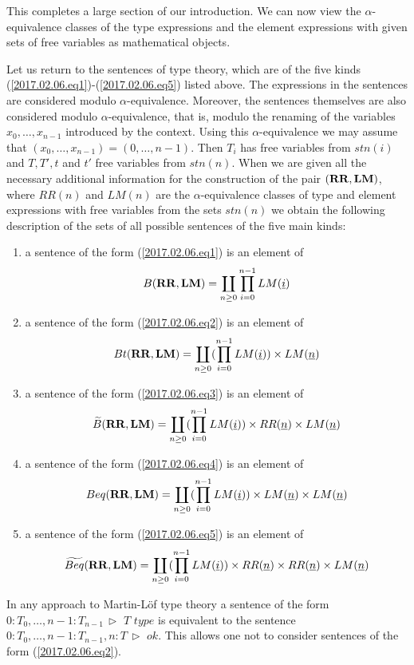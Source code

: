 \documentclass[12pt]{amsart}
\newcommand{\uu}{\underline}
\newcommand{\wt}{\widetilde}
\newcommand{\RR}{{\bf RR}}
\newcommand{\LM}{{\bf LM}}
\newcommand{\rh}{{\,\rhd\,\,}}
\newcommand{\type}{\,\,type}
\newcommand{\ff}[1]{\uu{#1}}
\begin{document}
This completes a large section of our introduction. We can now view the
$\alpha$-equivalence classes of the type expressions and the element expressions with given
sets of free variables as mathematical objects.

Let us return to the sentences of type theory, which are of the five kinds
(\ref{2017.02.06.eq1})-(\ref{2017.02.06.eq5}) listed above.  The expressions in the sentences
are considered modulo $\alpha$-equivalence. Moreover, the sentences
themselves are also considered modulo $\alpha$-equivalence, that is, modulo
the renaming of the variables $x_0,\dots,x_{n-1}$ introduced by the
context. Using this $\alpha$-equivalence we may assume that
$(x_0,\dots,x_{n-1})=(0,\dots,n-1)$. Then $T_i$ has free variables from
$stn(i)$ and $T,T',t$ and $t'$ free variables from $stn(n)$. When we are given
all the necessary additional information for the construction of the pair
$(\RR,\LM)$, where $RR(n)$ and $LM(n)$ are the $\alpha$-equivalence classes of
type and element expressions with free variables from the sets $stn(n)$ we
obtain the following description of the sets of all possible sentences of the
five main kinds:
%
\begin{enumerate}
\item a sentence of the form (\ref{2017.02.06.eq1}) is an element of
%
$$B(\RR,\LM)=\coprod_{n\ge 0} \prod_{i=0}^{n-1}LM(\ff{i})$$
%
\item a sentence of the form (\ref{2017.02.06.eq2}) is an element of
%
$$Bt(\RR,\LM)=\coprod_{n\ge 0} (\prod_{i=0}^{n-1}LM(\ff{i}))\times LM(\ff{n})$$
%
\item a sentence of the form (\ref{2017.02.06.eq3}) is an element of
%
$$\wt{B}(\RR,\LM)=\coprod_{n\ge 0} (\prod_{i=0}^{n-1}LM(\ff{i}))\times RR(\ff{n})\times LM(\ff{n})$$
%
\item a sentence of the form (\ref{2017.02.06.eq4}) is an element of
%
$$Beq(\RR,\LM)=\coprod_{n\ge 0} (\prod_{i=0}^{n-1}LM(\ff{i}))\times LM(\ff{n})\times LM(\ff{n})$$
%
\item a sentence of the form (\ref{2017.02.06.eq5}) is an element of
%
$$\wt{Beq}(\RR,\LM)=\coprod_{n\ge 0} (\prod_{i=0}^{n-1}LM(\ff{i}))\times RR(\ff{n})\times RR(\ff{n})\times LM(\ff{n})$$
%
\end{enumerate}
%
In any approach to Martin-L\"of type theory a sentence of the form
$0:T_0,\dots,n-1:T_{n-1}\rh T\type$ is equivalent to the sentence $0:T_0,\dots,
n-1:T_{n-1},n:T\rh ok$. This allows one not to consider sentences of the form
(\ref{2017.02.06.eq2}).
\end{document}
